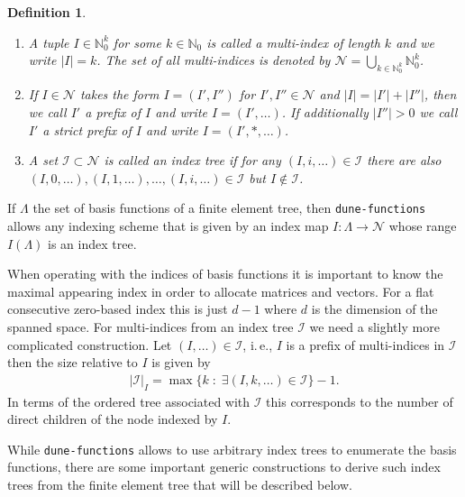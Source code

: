 \documentclass[a4paper,10pt,headings=normal,bibliography=totoc]{scrartcl}
\newtheorem{definition}{Definition}
\newcommand{\N}{\mathbb{N}}
\newcommand{\op}[1]{\operatorname{#1}}
\newcommand{\st}{\; : \;}
\newcommand{\dunemodule}[1]{\texttt{#1}}
\begin{document}
\begin{definition}
    \begin{enumerate}
        \item
            A tuple $I \in \N_0^k$ for some $k \in \N_0$ is called a multi-index of length $k$
            and we write $|I|=k$.
            The set of all multi-indices is denoted by
            $\mathcal{N} = \bigcup_{k \in \N_0^k} \N_0^k$.
        \item
            If $I \in \mathcal{N}$ takes the form $I = (I',I'')$ for $I',I'' \in \mathcal{N}$
            and $|I| = |I'|+|I''|$, then we call $I'$ a prefix of $I$ and write $I = (I',\dots)$.
            If additionally $|I''|>0$ we call $I'$ a strict prefix of $I$ and write $I = (I',*,\dots)$.
        \item
            A set $\mathcal{I} \subset \mathcal{N}$ is called an \emph{index tree}
            if for any $(I,i,\dots) \in \mathcal{I}$ there are also $(I,0,\dots),(I,1,\dots),\dots,(I,i,\dots) \in \mathcal{I}$
            but $I \notin \mathcal{I}$.
    \end{enumerate}
\end{definition}

If $\Lambda$ the set of basis functions of a finite element tree,
then \dunemodule{dune-functions} allows any indexing scheme that
is given by an index map $I: \Lambda \to \mathcal{N}$
whose range $I(\Lambda)$ is an index tree.

When operating with the indices of basis functions it is important
to know the maximal appearing index in order to allocate matrices
and vectors.
For a flat consecutive zero-based index this is just $d-1$ where
$d$ is the dimension of the spanned space. For multi-indices from
an index tree $\mathcal{I}$ we need a slightly more complicated
construction. Let $(I,\dots) \in \mathcal{I}$, i.\,e., $I$ is a
prefix of multi-indices in $\mathcal{I}$ then the size relative
to $I$ is given by
\begin{align*}
    |\mathcal{I}|_I = \op{max}\{k \st \exists (I,k,\dots) \in \mathcal{I} \}-1.
\end{align*}
In terms of the ordered tree associated with $\mathcal{I}$ this corresponds
to the number of direct children of the node indexed by $I$.


While \dunemodule{dune-functions} allows to use arbitrary index trees
to enumerate the basis functions, there are some important generic constructions
to derive such index trees from the finite element tree that will be described below.
\end{document}
